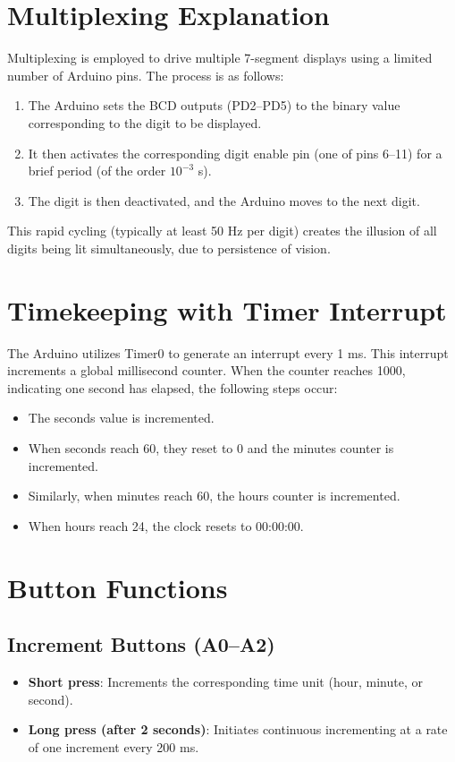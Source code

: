 \documentclass[a4paper,12pt]{article}
\begin{document}
\section{Multiplexing Explanation}
Multiplexing is employed to drive multiple 7-segment displays using a limited number of Arduino pins. The process is as follows:
\begin{enumerate}
    \item The Arduino sets the BCD outputs (PD2--PD5) to the binary value corresponding to the digit to be displayed.
    \item It then activates the corresponding digit enable pin (one of pins 6--11) for a brief period (of the order $10^{-3}$ s).
    \item The digit is then deactivated, and the Arduino moves to the next digit.
\end{enumerate}
This rapid cycling (typically at least 50 Hz per digit) creates the illusion of all digits being lit simultaneously, due to persistence of vision.

\section{Timekeeping with Timer Interrupt}
The Arduino utilizes Timer0 to generate an interrupt every 1 ms. This interrupt increments a global millisecond counter. When the counter reaches 1000, indicating one second has elapsed, the following steps occur:
\begin{itemize}
    \item The seconds value is incremented.
    \item When seconds reach 60, they reset to 0 and the minutes counter is incremented.
    \item Similarly, when minutes reach 60, the hours counter is incremented.
    \item When hours reach 24, the clock resets to 00:00:00.
\end{itemize}

\section{Button Functions}
\subsection{Increment Buttons (A0--A2)}
\begin{itemize}
    \item \textbf{Short press}: Increments the corresponding time unit (hour, minute, or second).
    \item \textbf{Long press (after 2 seconds)}: Initiates continuous incrementing at a rate of one increment every 200 ms.
\end{itemize}
\end{document}

